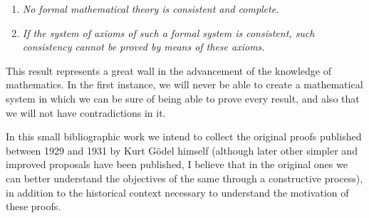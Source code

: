 \begin{center}
    \begin{enumerate}
        \item \textit{No formal mathematical theory is consistent and complete.}
        \item \textit{If the system of axioms of such a formal system is consistent, such consistency cannot be proved by means of these axioms.}
    \end{enumerate}
\end{center}

This result represents a great wall in the advancement of the knowledge of mathematics. In the first instance, we will never be able to create a 
mathematical system in which we can be sure of being able to prove every result, and also that we will not have contradictions in it. 

In this small bibliographic work we intend to collect the original proofs published between 1929 and 1931 by Kurt Gödel himself 
(although later other simpler and improved proposals have been published, I believe that in the original ones we can better understand the 
objectives of the same through a constructive process), in addition to the historical context necessary to understand the motivation of these 
proofs.

\endinput
